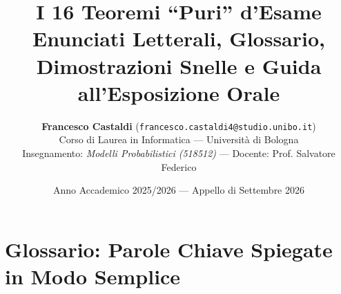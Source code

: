 \documentclass[11pt,a4paper]{report}
\begin{document}
\title{\textbf{\LARGE I 16 Teoremi ``Puri'' d'Esame}\\[0.3cm]
\large Enunciati Letterali, Glossario, Dimostrazioni Snelle e Guida all'Esposizione Orale}
\author{\textbf{Francesco Castaldi} (\texttt{francesco.castaldi4@studio.unibo.it})\\
Corso di Laurea in Informatica --- Università di Bologna\\
Insegnamento: \emph{Modelli Probabilistici (518512)} --- Docente: Prof. Salvatore Federico}
\date{Anno Accademico 2025/2026 --- Appello di Settembre 2026}

\maketitle
\tableofcontents
\newpage

\chapter*{Glossario: Parole Chiave Spiegate in Modo Semplice}
\end{document}
